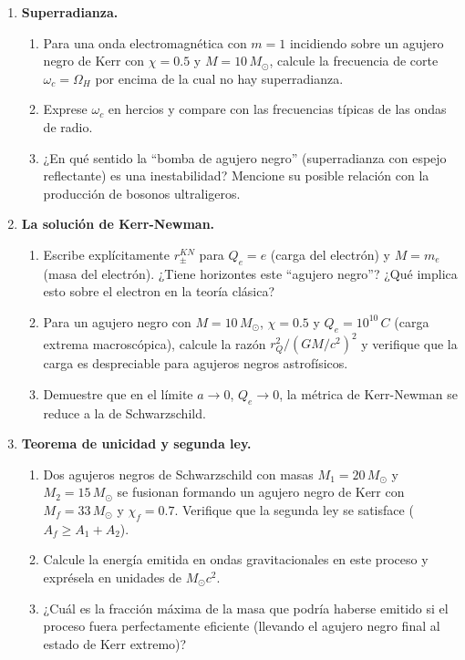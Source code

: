 \begin{enumerate}[leftmargin=2em, label=\textbf{P\thechapter.\arabic*.}]
  \item \textbf{Superradianza.}
  \begin{enumerate}[label=(\alph*)]
    \item Para una onda electromagnética con $m = 1$ incidiendo sobre un agujero negro de Kerr con $\chi = 0.5$ y $M = 10\,M_\odot$, calcule la frecuencia de corte $\omega_c = \Omega_H$ por encima de la cual no hay superradianza.
    \item Exprese $\omega_c$ en hercios y compare con las frecuencias típicas de las ondas de radio.
    \item ¿En qué sentido la ``bomba de agujero negro'' (superradianza con espejo reflectante) es una inestabilidad? Mencione su posible relación con la producción de bosonos ultraligeros.
  \end{enumerate}

  \item \textbf{La solución de Kerr-Newman.}
  \begin{enumerate}[label=(\alph*)]
    \item Escribe explícitamente $r_\pm^{KN}$ para $Q_e = e$ (carga del electrón) y $M = m_e$ (masa del electrón). ¿Tiene horizontes este ``agujero negro''? ¿Qué implica esto sobre el electron en la teoría clásica?
    \item Para un agujero negro con $M = 10\,M_\odot$, $\chi = 0.5$ y $Q_e = 10^{10}\,C$ (carga extrema macroscópica), calcule la razón $r_Q^2/(GM/c^2)^2$ y verifique que la carga es despreciable para agujeros negros astrofísicos.
    \item Demuestre que en el límite $a \to 0$, $Q_e \to 0$, la métrica de Kerr-Newman se reduce a la de Schwarzschild.
  \end{enumerate}

  \item \textbf{Teorema de unicidad y segunda ley.}
  \begin{enumerate}[label=(\alph*)]
    \item Dos agujeros negros de Schwarzschild con masas $M_1 = 20\,M_\odot$ y $M_2 = 15\,M_\odot$ se fusionan formando un agujero negro de Kerr con $M_f = 33\,M_\odot$ y $\chi_f = 0.7$. Verifique que la segunda ley se satisface ($A_f \geq A_1 + A_2$).
    \item Calcule la energía emitida en ondas gravitacionales en este proceso y exprésela en unidades de $M_\odot c^2$.
    \item ¿Cuál es la fracción máxima de la masa que podría haberse emitido si el proceso fuera perfectamente eficiente (llevando el agujero negro final al estado de Kerr extremo)?
  \end{enumerate}


\end{enumerate}
